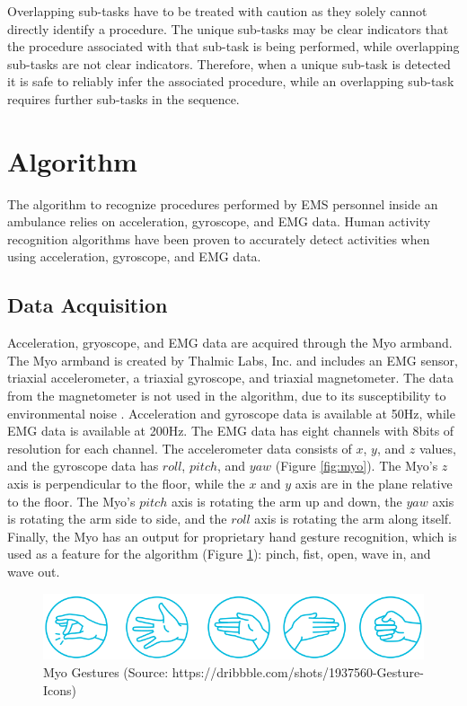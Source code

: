 Overlapping sub-tasks have to be treated with caution as they solely cannot directly identify a procedure. The unique sub-tasks may be clear indicators that the procedure associated with that sub-task is being performed, while overlapping sub-tasks are not clear indicators. Therefore, when a unique sub-task is detected it is safe to reliably infer the associated procedure, while an overlapping sub-task requires further sub-tasks in the sequence.

\section{Algorithm}
\label{sec:Approach:Algorithm}
The algorithm to recognize procedures performed by EMS personnel inside an ambulance relies on acceleration, gyroscope, and EMG data. Human activity recognition algorithms have been proven to accurately detect activities when using acceleration, gyroscope, and EMG data.

\subsection{Data Acquisition}
Acceleration, gryoscope, and EMG data are acquired through the Myo armband. The Myo armband is created by Thalmic Labs, Inc. and includes an EMG sensor, triaxial accelerometer, a triaxial gyroscope, and triaxial magnetometer. The data from the magnetometer is not used in the algorithm, due to its susceptibility to environmental noise \cite{Ahmad2013}. Acceleration and gyroscope data is available at 50Hz, while EMG data is available at 200Hz. The EMG data has eight channels with 8bits of resolution for each channel. The accelerometer data consists of $x$, $y$, and $z$ values, and the gyroscope data has $roll$, $pitch$, and $yaw$ (Figure \ref{fig:myo}). The Myo's $z$ axis is perpendicular to the floor, while the $x$ and $y$ axis are in the plane relative to the floor. The Myo's $pitch$ axis is rotating the arm up and down, the $yaw$ axis is rotating the arm side to side, and the $roll$ axis is rotating the arm along itself. Finally, the Myo has an output for proprietary hand gesture recognition, which is used as a feature for the algorithm (Figure \ref{fig:myogestures}): pinch, fist, open, wave in, and wave out.
\begin{figure}
	\centering
	\includegraphics[width=0.7\linewidth]{pictures/myogestures}
	\caption{Myo Gestures (Source: https://dribbble.com/shots/1937560-Gesture-Icons)}
	\label{fig:myogestures}
\end{figure}


